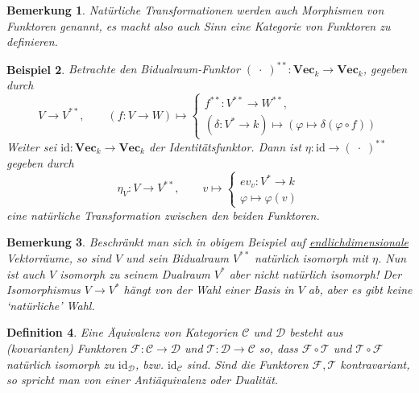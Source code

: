 \documentclass[a4paper, 11pt]{scrartcl}
\newcommand{\id}{\text{id}}
\theoremstyle{basicstyle}
\newtheorem{definition}{Definition}[section]
\newtheorem{bemerkung}[definition]{Bemerkung}
\newtheorem{beispiel}[definition]{Beispiel}
\begin{document}
    \begin{bemerkung}\label{bem:1}
        Natürliche Transformationen werden auch \emph{Morphismen von Funktoren} genannt, es macht also auch Sinn eine Kategorie von Funktoren zu definieren.
    \end{bemerkung}

    \begin{beispiel}
        Betrachte den Bidualraum-Funktor \((\;\cdot\;)^{\ast\ast}: \textbf{Vec}_k \to \textbf{Vec}_k\), gegeben durch
        \begin{equation*}
            V \to V^{\ast\ast}, \qquad
            (f: V \to W) \mapsto \begin{cases}
                f^{\ast\ast}: V^{\ast\ast} \to W^{\ast\ast}, \\
                (\delta: V^\ast \to k) \mapsto (\varphi \mapsto \delta(\varphi \circ f))
            \end{cases}
        \end{equation*}
        Weiter sei \(\id: \textbf{Vec}_k \to \textbf{Vec}_k\) der Identitätsfunktor.
        Dann ist \(\eta: \id \to (\;\cdot\;)^{\ast\ast}\) gegeben durch
        \begin{equation*}
            \eta_V : V \longrightarrow V^{\ast\ast}, \qquad v \mapsto \begin{cases}
                ev_v: V^\ast \to k \\
                \varphi \mapsto \varphi(v)
            \end{cases}
        \end{equation*}
        eine natürliche Transformation zwischen den beiden Funktoren.
    \end{beispiel}

    \begin{bemerkung}
        Beschränkt man sich in obigem Beispiel auf \underline{endlichdimensionale} Vektorräume, so sind \(V\) und sein Bidualraum \(V^{\ast\ast}\) natürlich isomorph mit \(\eta\).
        Nun ist auch \(V\) isomorph zu seinem Dualraum \(V^\ast\) aber nicht natürlich isomorph!
        Der Isomorphismus \(V \to V^\ast\) hängt von der Wahl einer Basis in \(V\) ab, aber es gibt keine `natürliche' Wahl.
    \end{bemerkung}

    \begin{definition}
        Eine \emph{Äquivalenz von Kategorien} \(\mathcal{C}\) und \(\mathcal{D}\) besteht aus (kovarianten) Funktoren \(\mathcal{F} : \mathcal{C} \to \mathcal{D}\) und \(\mathcal{T} : \mathcal{D} \to \mathcal{C}\) so, dass \(\mathcal{F} \circ \mathcal{T}\) und \(\mathcal{T} \circ \mathcal{F}\) natürlich isomorph zu \(\id_{\mathcal{D}}\), bzw. \(\id_{\mathcal{C}}\) sind.
        Sind die Funktoren \(\mathcal{F}, \mathcal{T}\) kontravariant, so spricht man von einer \emph{Antiäquivalenz} oder \emph{Dualität}.
    \end{definition}
\end{document}
